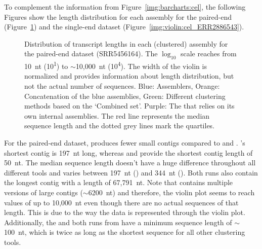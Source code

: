 \documentclass[12pt,a4paper,english]{article}
\begin{document}
    To complement the information from Figure~\ref{img:barcharts:cel}, the following Figures show the length distribution for each assembly for the paired-end (Figure~\ref{img:violin:cel_SRR5456164}) and the single-end dataset (Figure~\ref{img:violin:cel_ERR2886543}).
    		\begin{figure}[H]
    	\centering
    	\def\svgwidth{\textwidth}
    	
    	\caption[Distribution of transcript lengths per assembly (PE, SRR5456164)]{Distribution of transcript lengths in each (clustered) assembly for the paired-end \celegans dataset (SRR5456164). The $\log_{10}$ scale reaches from 10~nt (10\textsuperscript{1}) to $\sim$10,000~nt (10\textsuperscript{4}). The width of the violin is normalized and provides information about length distribution, but not the actual number of sequences. Blue: Assemblers, Orange: Concatenation of the blue assemblies, Green: Different clustering methods based on the `Combined set'. Purple: The \orp that relies on its own internal assemblies. The red line represents the median sequence length and the dotted grey lines mark the quartiles.}
    	\label{img:violin:cel_SRR5456164}
    \end{figure}
	For the paired-end dataset, \trinity produces fewer small contigs compared to \soap and \spades. \trinity's shortest contig is 197~nt long, whereas \spades and \soap provide the shortest contig length of 50~nt.
	The median sequence length doesn't have a huge difference throughout all different tools and varies between 197~nt (\mclust) and 344~nt (\grouper). Both \grouper runs also contain the longest contig with a length of 67,791~nt.
	Note that \grouper contains multiple versions of large contigs ($\sim$6200~nt) and therefore, the violin plot seems to reach values of up to 10,000~nt even though there are no actual sequences of that length. This is due to the way the data is represented through the violin plot.
	Additionally, the \orp and both runs from \grouper have a minimum sequence length of $\sim$100~nt, which is twice as long as the shortest sequence for all other clustering tools.
\end{document}
